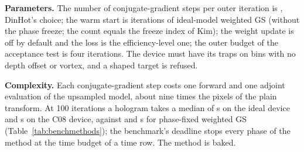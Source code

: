 \textbf{Parameters.} The number of conjugate-gradient steps per outer iteration is , DinHot's choice; the warm start is  iterations of ideal-model weighted GS (without the phase freeze; the count equals the freeze index of Kim); the weight update is off by default and the loss is the efficiency-level one; the outer budget of the acceptance test is four iterations. The device must have its traps on bins with no depth offset or vortex, and a shaped target is refused.

\textbf{Complexity.} Each conjugate-gradient step costs one forward and one adjoint evaluation of the upsampled model, about nine times the pixels of the plain transform. At 100 iterations a hologram takes a median of \benchSecIdealBOne{} s on the ideal device and \benchSecDeviceBOne{} s on the C08 device, against \benchSecIdealPF{} and \benchSecDevicePF{} s for phase-fixed weighted GS (Table~\ref{tab:benchmethods}); the benchmark's deadline stops every phase of the method at the time budget of a time row. The method is baked.

